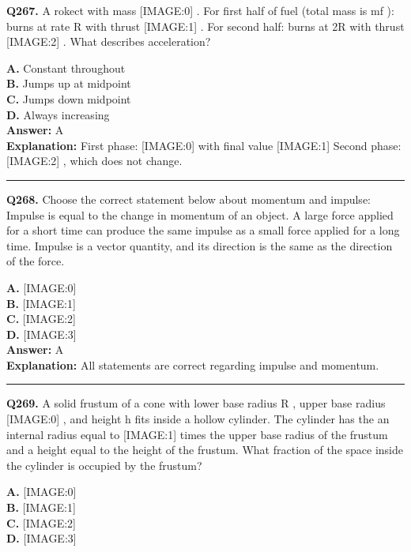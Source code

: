 \documentclass[12pt]{article}
\begin{document}
\noindent
\textbf{Q267.} A rokect with mass
[IMAGE:0]
. For first half of fuel (total mass is mf
): burns at rate R with thrust
[IMAGE:1]
. For second half: burns at 2R with thrust
[IMAGE:2]
.
What describes acceleration?



\textbf{A.} Constant throughout \\
\textbf{B.} Jumps up at midpoint \\
\textbf{C.} Jumps down midpoint \\
\textbf{D.} Always increasing \\

\textbf{Answer:} A \\
\textbf{Explanation:} First phase:
[IMAGE:0]
with final value
[IMAGE:1]
Second phase:
[IMAGE:2]
, which does not change.

\hrule
\vspace{1em}


\noindent
\textbf{Q268.} Choose the correct statement below about momentum and impulse:
Impulse is equal to the change in momentum of an object.
A large force applied for a short time can produce the same impulse as a small force applied for a long time.
Impulse is a vector quantity, and its direction is the same as the direction of the force.



\textbf{A.} [IMAGE:0] \\
\textbf{B.} [IMAGE:1] \\
\textbf{C.} [IMAGE:2] \\
\textbf{D.} [IMAGE:3] \\

\textbf{Answer:} A \\
\textbf{Explanation:} All statements are correct regarding impulse and momentum.

\hrule
\vspace{1em}


\noindent
\textbf{Q269.} A solid frustum of a cone with lower base radius R
, upper base radius
[IMAGE:0]
, and height h
fits inside a hollow cylinder. The cylinder has the an internal radius equal to
[IMAGE:1]
times the upper base radius of the frustum and a height equal to the height of the frustum. What fraction of the space inside the cylinder is occupied by the frustum?



\textbf{A.} [IMAGE:0] \\
\textbf{B.} [IMAGE:1] \\
\textbf{C.} [IMAGE:2] \\
\textbf{D.} [IMAGE:3] \\
\end{document}
